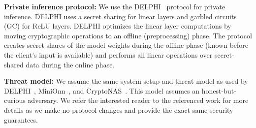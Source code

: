 \textbf{Private inference protocol:}
We use the DELPHI~\cite{mishra2020delphi} protocol for private inference. 
DELPHI uses a secret sharing for linear layers and garbled circuits (GC) for ReLU layers. 
DELPHI optimizes the linear layer computations by moving cryptographic operations to an offline (preprocessing) phase. 
The protocol creates secret shares of the model weights during the offline phase (known before the client's input is available) and performs all linear operations over secret-shared data during the online phase.

\textbf{Threat model:}
We assume the same system setup and threat model as used by DELPHI~\cite{mishra2020delphi}, MiniOnn~\cite{liu2017oblivious}, and CryptoNAS~\cite{ghodsi2020cryptonas}.
This model assumes an honest-but-curious adversary.
We refer the interested reader to the referenced work for more details 
as we make no protocol changes and provide the exact same security guarantees.



